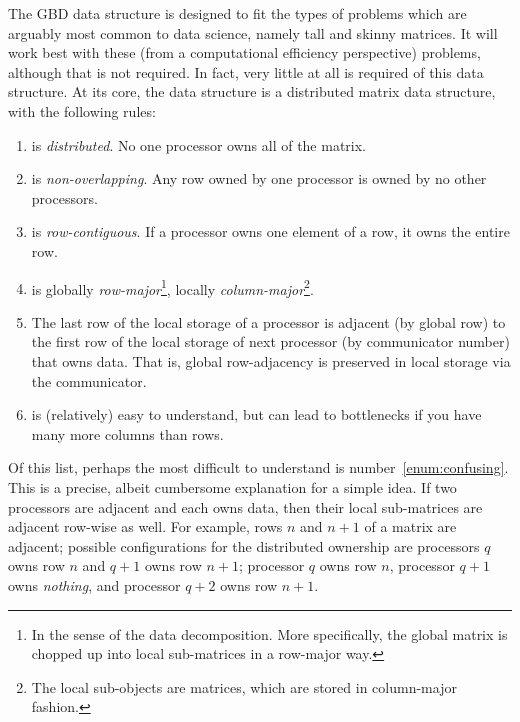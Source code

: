 The GBD data structure is designed to fit the types of problems which
are arguably most common to data science, namely tall and skinny matrices.
It will work best with these (from a computational efficiency perspective)
problems, although that is not required. In fact, very little at all is
required of this data structure. At its core, the data structure is a
distributed matrix data structure, with the following rules:
  \begin{enumerate}
    \item {} is \emph{distributed}. No one processor owns all of
          the matrix.
    \item {} is \emph{non-overlapping}. Any row owned by one
          processor is owned by no other processors.
    \item {} is \emph{row-contiguous}. If a processor owns one
          element of a row, it owns the entire row.
    \item {} is globally \emph{row-major}\footnote{In the sense of
          the data decomposition. More specifically, the global matrix is
          chopped up into local sub-matrices in a row-major way.},
          locally \emph{column-major}\footnote{The local sub-objects are
           matrices, which are stored in column-major fashion.}.
    \item The last row of the local storage of a processor is adjacent
          (by global row) to the first row of the local storage of next
          processor (by communicator number) that owns data. That is, global
          row-adjacency is preserved in local storage via the
          communicator.\label{enum:confusing}
    \item {} is (relatively) easy to understand, but can lead to
          bottlenecks if you have many more columns than rows.
  \end{enumerate}

Of this list, perhaps the most difficult to understand is
number~\ref{enum:confusing}. This is a precise, albeit cumbersome explanation
for a simple idea. If two processors are adjacent and each owns data,
then their local sub-matrices are adjacent row-wise as well. For example,
rows $n$ and $n+1$ of a matrix are adjacent; possible configurations for
the distributed ownership are processors $q$ owns row $n$ and $q+1$ owns
row $n+1$; processor $q$ owns row $n$, processor $q+1$ owns \emph{nothing},
and processor $q+2$ owns row $n+1$.

